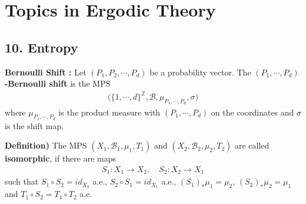 \documentclass[12pt,a4paper]{report}
\DeclarePairedDelimiter\bignorm{\lVert}{\rVert}
\begin{document}
\newcommand{\thm}{\textbf{Theorem) }}
\newcommand{\thmnum}[1]{\textbf{Theorem #1) }}
\newcommand{\defi}{\textbf{Definition) }}
\newcommand{\lem}{\textbf{Lemma) }}
\newcommand{\lemnum}[1]{\textbf{Lemma #1) }}
\newcommand{\prop}{\textbf{Proposition) }}
\newcommand{\pf}{\textbf{proof) }}
\newcommand{\cor}{\textbf{Corollary) }}
\newcommand{\cornum}[1]{\textbf{Corollary #1) }}

\newcommand{\lap}{\triangle} %
\newcommand{\s}{\vspace{10pt}}
\newcommand{\bull}{$\bullet$}
\newcommand{\sta}{$\star$}
\newcommand{\reals}{\mathbb{R}}

\newcommand{\eop}{\hfill  \textsl{(End of proof)} $\square$} %

\newcommand{\intN}{\mathbb{Z}_N}
\newcommand{\norms}[2]{\bignorm[\big]{#1}_{#2}}
\newcommand{\abs}[1]{\big| #1 \big|}
\newcommand{\avg}{\mathbb{E}}
\newcommand{\borel}{\mathscr{B}}
\newcommand{\setlimsup}[2]{\bigcap_{#1=1}^{\infty}\bigcup_{#2=#1}^{\infty}}
\newcommand{\dlim}{D\text{-}\lim}
\newcommand{\clim}{C\text{-}\lim}

\newcommand{\newday}{======================================================================}
\newcommand{\digression}{**********************************************************************************************}

\setlength\parindent{0pt}
\noindent

\chapter*{Topics in Ergodic Theory}
\s

\section*{10. Entropy}

\textbf{Bernoulli Shift : } Let $(P_1, P_2,\cdots, P_d)$ be a probability vector. The \textbf{$(P_1, \cdots, P_d)$-Bernoulli shift} is the MPS
\begin{align*}
\big( \{1,\cdots, d\}^{\mathbb{Z}}, \borel, \mu_{P_1,\cdots, P_d},\sigma \big)
\end{align*}
where $\mu_{P_1,\cdots, P_d}$ is the product measure with $(P_1,\cdots, P_d)$ on the coordinates and $\sigma$ is the shift map.
\s

\defi The MPS $(X_1, \borel_1, \mu_1, T_1)$ and $(X_2,\borel_2, \mu_2, T_2)$ are called \textbf{isomorphic}, if there are maps
\begin{align*}
S_1 : X_1\rightarrow X_2,\quad S_2 : X_2 \rightarrow X_1
\end{align*}
such that $S_1 \circ S_2 = id_{X_2}$ a.e., $S_2 \circ S_1 = id_{X_1}$ a.e., $(S_1)_* \mu_1 =\mu_2$, $(S_2)_* \mu_2 =\mu_1$ and $T_1 \circ S_2 = T_1 \circ T_2$ a.e.
\s
\end{document}
